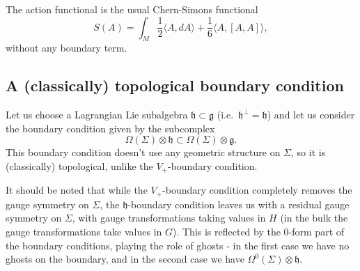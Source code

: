\documentclass[a4paper]{amsart}
\theoremstyle{plain}
\theoremstyle{definition}
\newcommand{\g}{\mathfrak{g}}
\newcommand{\h}{\mathfrak{h}}
\newcommand{\la}{\langle}
\newcommand{\ra}{\rangle}
\begin{document}
The action functional is the usual Chern-Simons functional
$$S(A)=\int_M \frac 12 \la A,dA\ra + \frac16 \la A,[A,A]\ra,$$
without any boundary term.


\subsection{A (classically) topological boundary condition}
Let us choose a Lagrangian Lie subalgebra $\h\subset\g$ (i.e.\ $\h^\perp=\h$) and let us consider the boundary condition given by the subcomplex
\begin{equation}\label{h-bc}
\Omega(\Sigma)\otimes\h\subset\Omega(\Sigma)\otimes\g.
\end{equation}
This boundary condition doesn't use any geometric structure on $\Sigma$, so it is (classically) topological, unlike the $V_+$-boundary condition. 

It should be noted that while the $V_+$-boundary condition completely removes the gauge symmetry on $\Sigma$, the  $\h$-boundary condition leaves us with a residual gauge symmetry on $\Sigma$, with gauge transformations taking values in $H$ (in the bulk the gauge transformations take values in $G$). This is reflected by the 0-form part of the boundary conditions, playing the role of ghosts - in the first case we have no ghosts on the boundary, and in the second case we have $\Omega^0(\Sigma)\otimes\h$. 
\end{document}
